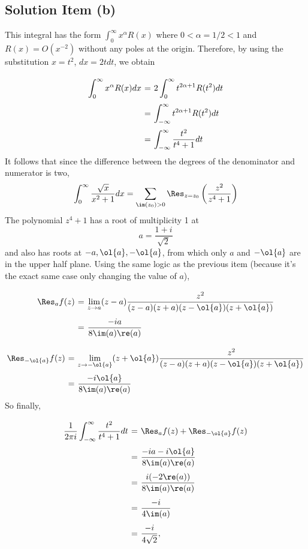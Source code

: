 \subsection*{Solution Item (b)}
This integral has the form $\int_0^{\infty} x^\alpha R(x)$ where $0< \alpha = 1/2 < 1$ and $R(x) = O(x^{-2})$ without any poles at the origin. Therefore, by using the substitution $ x = t^2$, $dx = 2t dt$, we obtain
\[ \everymath{\displaystyle}
\arraycolsep=1.8pt\def\arraystretch{2.5}
\begin{array}{rcl}
    \int_{0}^{\infty} x^{\alpha} R(x) dx & = & 2 \int_{0}^{\infty} t^{2\alpha +1 }R(t^2) dt\\
    & = & \int_{-\infty}^{\infty} t^{2\alpha +1 }R(t^2)  dt\\
    & = & \int_{-\infty}^{\infty} \frac{t^2}{t^4+1} dt
\end{array} \]
It follows that since the difference between the degrees of the denominator and numerator is two,
\[ \int_{0}^{\infty} \frac{\sqrt{x}}{x^2+1} dx = \sum_{\im(z_0) > 0} \Res_{z = z_0} \left(  \frac{z^2}{z^4+1} \right)\]
The polynomial $z^4 + 1$ has a root of multiplicity 1 at
\[ a = \frac{1+i}{\sqrt{2}} \]
and also has roots at $-a,\ol{a},-\ol{a}$, from which only $a$ and $-\ol{a}$ are in the upper half plane. Using the same logic as the previous item (because it's the exact same case only changing the value of $a$),
\[ \everymath{\displaystyle}
\arraycolsep=1.8pt\def\arraystretch{2.5}
\begin{array}{rcl}
    \Res_a f(z) & = & \lim_{z\to a} (z-a)\frac{z^2}{(z-a)(z+a)(z-\ol{a})(z+\ol{a})}\\
    & = & \frac{-ia}{8\im(a)\re(a)}
\end{array} \]
\[ \everymath{\displaystyle}
\arraycolsep=1.8pt\def\arraystretch{2.5}
\begin{array}{rcl}
    \Res_{-\ol{a}} f(z) & = & \lim_{z\to -\ol{a}} (z+\ol{a})\frac{z^2}{(z-a)(z+a)(z-\ol{a})(z+\ol{a})}\\
    & = & \frac{-i\ol{a}}{8\im(a)\re(a)}
\end{array} \]
So finally,
\[ \everymath{\displaystyle}
\arraycolsep=1.8pt\def\arraystretch{2.5}
\begin{array}{rcl}
    \frac{1}{2\pi i}\int_{-\infty}^{\infty} \frac{t^2}{t^{4} + 1} dt & = & \Res_a f(z) + \Res_{-\ol{a}} f(z)\\
    & = & \frac{-ia - i\ol{a}}{8\im(a)\re(a)}\\
    & = & \frac{i(-2 \re(a))}{8\im(a)\re(a)}\\
    & = & \frac{-i}{4 \im(a)}\\
    & = & \frac{-i}{4\sqrt{2}},
\end{array} \]
